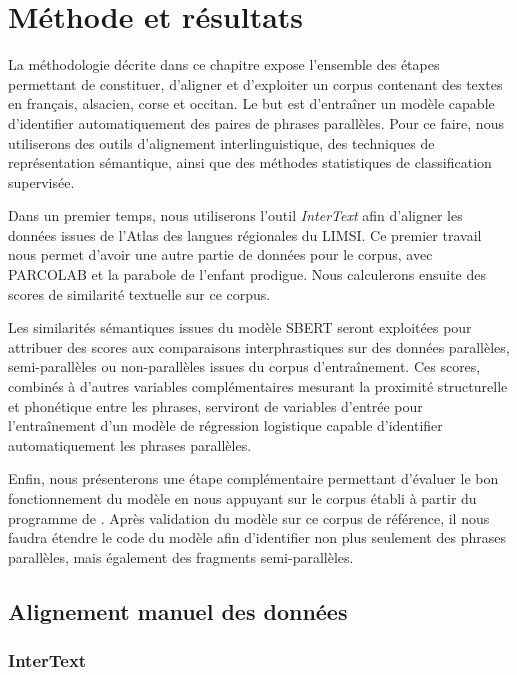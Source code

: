 \chapter{Méthode et résultats}

La méthodologie décrite dans ce chapitre expose l’ensemble des étapes permettant de constituer, d’aligner et
d’exploiter un corpus contenant des textes en français, alsacien, corse et occitan. Le but est d’entraîner
un modèle capable d’identifier automatiquement des
paires de phrases parallèles. Pour ce faire, nous utiliserons des outils d’alignement interlinguistique,
des techniques de représentation sémantique, ainsi que des méthodes statistiques de classification supervisée.

Dans un premier temps, nous utiliserons l’outil \textit{InterText} afin d'aligner les données issues de
l’Atlas des langues régionales du LIMSI. Ce premier travail nous permet d'avoir une autre partie de données pour le corpus,
avec PARCOLAB et la parabole de l'enfant prodigue. Nous calculerons ensuite des scores de similarité textuelle
sur ce corpus.

Les similarités sémantiques issues du modèle SBERT seront
exploitées pour attribuer des scores aux comparaisons interphrastiques sur des données parallèles,
semi-parallèles ou non-parallèles issues du corpus d'entraînement. Ces scores, combinés à d'autres variables
complémentaires mesurant la proximité structurelle et phonétique entre les phrases,
serviront de variables d'entrée pour l'entraînement d'un modèle de régression logistique capable
d'identifier automatiquement les phrases parallèles.

Enfin, nous présenterons une étape complémentaire permettant d’évaluer le bon fonctionnement du modèle en nous
appuyant sur le corpus établi à partir du programme de \citet{tsolakis_2024}. Après validation du modèle sur ce corpus de
référence, il nous faudra étendre le code du modèle afin d'identifier non plus seulement des phrases
parallèles, mais également des fragments semi-parallèles.

\newpage

\section{Alignement manuel des données}

\subsection{InterText}

